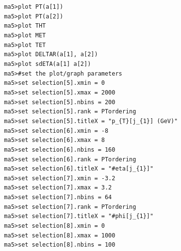 \documentclass[a4paper, 10pt]{article}
\begin{document}
\texttt{ }\texttt{ }\texttt{ma5>plot PT(a[1])\\
}
\texttt{ }\texttt{ }\texttt{ma5>plot PT(a[2])\\
}
\texttt{ }\texttt{ }\texttt{ma5>plot THT\\
}
\texttt{ }\texttt{ }\texttt{ma5>plot MET\\
}
\texttt{ }\texttt{ }\texttt{ma5>plot TET\\
}
\texttt{ }\texttt{ }\texttt{ma5>plot DELTAR(a[1], a[2])\\
}
\texttt{ }\texttt{ }\texttt{ma5>plot sdETA(a[1] a[2])\\
}
\texttt{ }\texttt{ }\texttt{ma5>\#set the plot/\-graph parameters\\
}
\texttt{ }\texttt{ }\texttt{ma5>set selection[5].xmin = 0\\
}
\texttt{ }\texttt{ }\texttt{ma5>set selection[5].xmax = 2000\\
}
\texttt{ }\texttt{ }\texttt{ma5>set selection[5].nbins = 200\\
}
\texttt{ }\texttt{ }\texttt{ma5>set selection[5].rank = PTordering\\
}
\texttt{ }\texttt{ }\texttt{ma5>set selection[5].titleX = "p\_\{T\}[j\_\{1\}] (GeV)"\\
}
\texttt{ }\texttt{ }\texttt{ma5>set selection[6].xmin = -8\\
}
\texttt{ }\texttt{ }\texttt{ma5>set selection[6].xmax = 8\\
}
\texttt{ }\texttt{ }\texttt{ma5>set selection[6].nbins = 160\\
}
\texttt{ }\texttt{ }\texttt{ma5>set selection[6].rank = PTordering\\
}
\texttt{ }\texttt{ }\texttt{ma5>set selection[6].titleX = "\#eta[j\_\{1\}]"\\
}
\texttt{ }\texttt{ }\texttt{ma5>set selection[7].xmin = -3.2\\
}
\texttt{ }\texttt{ }\texttt{ma5>set selection[7].xmax = 3.2\\
}
\texttt{ }\texttt{ }\texttt{ma5>set selection[7].nbins = 64\\
}
\texttt{ }\texttt{ }\texttt{ma5>set selection[7].rank = PTordering\\
}
\texttt{ }\texttt{ }\texttt{ma5>set selection[7].titleX = "\#phi[j\_\{1\}]"\\
}
\texttt{ }\texttt{ }\texttt{ma5>set selection[8].xmin = 0\\
}
\texttt{ }\texttt{ }\texttt{ma5>set selection[8].xmax = 1000\\
}
\texttt{ }\texttt{ }\texttt{ma5>set selection[8].nbins = 100\\
}
\end{document}
